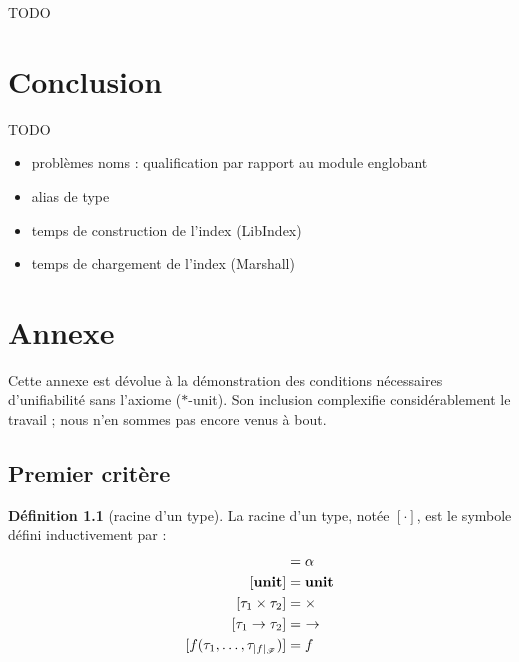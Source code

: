 \documentclass[a4paper]{report}
\theoremstyle{definition}
\newtheorem{definition}[theoreme]{Définition}
\newcommand{\unit}{\bold{unit}}
\newcommand{\F}{\mathscr F}
\begin{document}
TODO


\chapter{Conclusion}

TODO
\begin{itemize}
	\item problèmes noms : qualification par rapport au module englobant
	\item alias de type
	\item temps de construction de l'index (LibIndex)
	\item temps de chargement de l'index (Marshall)
\end{itemize}


\chapter* {Annexe}

Cette annexe est dévolue à la démonstration des conditions nécessaires d'unifiabilité sans l'axiome ($*$-unit). Son inclusion complexifie considérablement le travail ; nous n'en sommes pas encore venus à bout.


\section{Premier critère}

\begin{definition}[racine d'un type]
	La racine d'un type, notée $[ \cdot ]$, est le symbole défini inductivement par :
	\begin{align*}
			[ \alpha ] &= \alpha
		\\
			[ \unit ] &= \unit
		\\
			[ \tau_1 \times \tau_2 ] &= \times
		\\
			[ \tau_1 \rightarrow \tau_2 ] &=\ \rightarrow
		\\
			[ f (\tau_1, \dots, \tau_{|f|_\F}) ] &= f
	\end{align*}
\end{definition}
\end{document}
